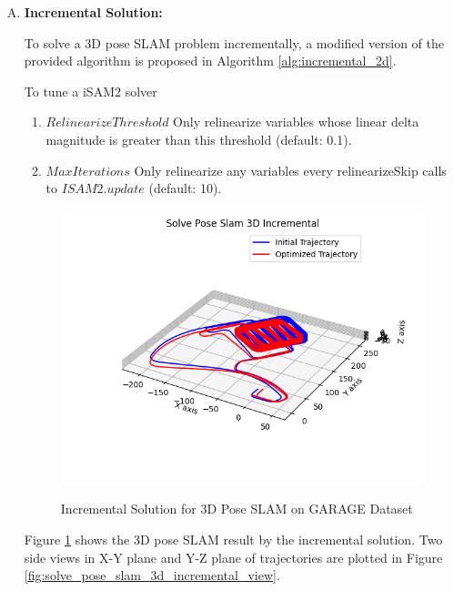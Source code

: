 \documentclass[11pt, oneside, letter]{article}
\begin{document}
\begin{enumerate}[A.]
\item \textbf{Incremental Solution:}

To solve a 3D pose SLAM problem incrementally, a modified version of the provided algorithm is proposed in Algorithm \ref{alg:incremental_2d}.

To tune a iSAM2 solver
\begin{enumerate}[1.]
    \item $RelinearizeThreshold$ Only relinearize variables whose linear delta magnitude is greater than this threshold (default: 0.1).
    \item $MaxIterations$ Only relinearize any variables every relinearizeSkip calls to $ISAM2.update$  (default: 10).
\end{enumerate}

\begin{figure}[H]
    \centering
        \textsf{\includegraphics[width=0.65\columnwidth]{../figures/solve_pose_slam_3d_incremental.png}}
        \caption{Incremental Solution for 3D Pose SLAM on GARAGE Dataset}
        \label{fig:solve_pose_slam_3d_incremental}
\end{figure}

Figure \ref{fig:solve_pose_slam_3d_incremental} shows the 3D pose SLAM result by the incremental solution. 
Two side views in X-Y plane and Y-Z plane of trajectories are plotted in Figure \ref{fig:solve_pose_slam_3d_incremental_view}.


\end{enumerate}
\end{document}
